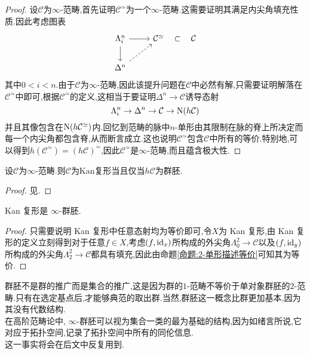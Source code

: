 \begin{proof}
    设$\mathcal{C}$为$\infty$-范畴,首先证明$\mathcal{C}^{\simeq}$为一个$\infty$-范畴.这需要证明其满足内尖角填充性质.因此考虑图表
    \[\begin{tikzcd}
	{\Lambda_i^n} & {\mathcal{C}^{\simeq}} & {\mathcal{C}} \\
	{\Delta^n}
	\arrow[from=1-1, to=1-2]
	\arrow[from=1-1, to=2-1]
	\arrow["{\subset }"{marking, allow upside down}, draw=none, from=1-2, to=1-3]
	\arrow[dashed, from=2-1, to=1-2]
    \end{tikzcd}\]
    其中$0<i<n$.由于$\mathcal{C}$为$\infty$-范畴,因此该提升问题在$\mathcal{C}$中必然有解,只需要证明解落在$\mathcal{C}^{\simeq}$中即可,根据$\mathcal{C}^{\simeq}$的定义,这相当于要证明$\Delta^n\to \mathcal{C}$诱导态射
    \[
        \Lambda_i^n \to \Delta^n \to \mathcal{C}\to \operatorname{N}(h\mathcal{C})
    \]
    并且其像包含在$\operatorname{N}(h\mathcal{C}^{\simeq})$内.回忆到范畴的脉中$n$-单形由其限制在脉的脊上所决定而每一个内尖角都包含脊,从而断言成立.这也说明$\mathcal{C}^{\simeq}$包含$\mathcal{C}$中所有的等价.特别地,可以得到$h(\mathcal{C}^{\simeq}) = (h\mathcal{C})^{\simeq}$,因此$\mathcal{C}^{\simeq}$是$\infty$-范畴,而且蕴含极大性.
\end{proof}
\begin{theorem}[Joyal]
    设$\mathcal{C}$为$\infty$-范畴.则$\mathcal{C}$为Kan复形当且仅当$h\mathcal{C}$为群胚.
\end{theorem}
\begin{proof}
    见\cite{Joyal}.
\end{proof}
\begin{lemma}
    Kan 复形是 $\infty$-群胚.
\end{lemma}
\begin{proof}
    只需要说明 Kan 复形中任意态射均为等价即可,令$X$为 Kan 复形,由 Kan 复形的定义立刻得到对于任意$f \in X$,考虑$(f,\mathrm{id}_x)$所构成的外尖角$\Lambda_0^2 \to \mathcal{C}$以及$(f,\mathrm{id}_y)$所构成的外尖角$\Lambda_2^2 \to \mathcal{C}$都具有填充,因此由命题\ref{命题:2-单形描述等价}可知其为等价.
\end{proof}
\begin{fact}\label{事实:群胚}
    群胚不是群的推广而是集合的推广,这是因为群的$1$-范畴不等价于单对象群胚的$2$-范畴.只有在选定基点后,才能够典范的取出群.当然,群胚这一概念比群更加基本,因为其没有代数结构.\\
    在高阶范畴论中, $\infty$-群胚可以视为集合一类的最为基础的结构,因为如绪言所说,它对应于拓扑空间,记录了拓扑空间中所有的同伦信息.\\
    这一事实将会在后文中反复用到.
\end{fact}
